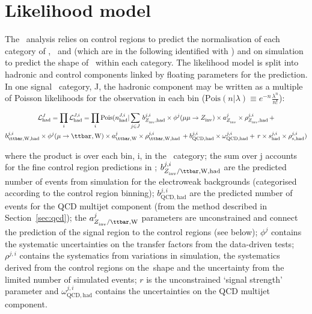 \section{Likelihood model}
\label{sec:likelihood}

The \alphat~analysis relies on control regions to predict the normalisation of each category of \njet, \nb~and \scalht 
(which are in the following identified with \htcat) and on simulation to predict the shape 
of \mht~within each category. The likelihood model is split into hadronic and control components
linked by floating parameters for the prediction. In one signal \htcat~category, J, 
the hadronic component may be written as a multiple of Poisson likelihoods
for the observation in each \mht bin 
($\mathrm{Pois}(n|\lambda) \equiv e^{-n}\frac{\lambda^{n}}{n!}$):

\begin{multline}
\label{eq:hadronicLikelihood}
\mathcal{L}^{J}_{\mathrm{had}} = \prod_i \mathcal{L}^{J,i}_{\mathrm{had}} = \prod_i \mathrm{Pois}(n^{J,i}_{\mathrm{had}} |\sum_{j \in J}\, b^{j,i}_{\zInv~,\mathrm{had}}\times\phi^{j}(\mu\mu\rightarrow\zInv~)\times a_{\zInv~}^{j}\times\rho^{j,i}_{\zInv~,\mathrm{had}}\, + \\ 
b^{j,i}_{\ttw,\mathrm{had}}\times\phi^{j}(\mu\rightarrow\ttw)\times a_{\ttw}^{j}\times\rho^{j,i}_{\ttw,\mathrm{had}}\, + b^{j,i}_{\text{QCD},\mathrm{had}}\times\omega^{j,i}_{\text{QCD},\mathrm{had}} + \,r\times s^{j,i}_{\mathrm{had}}\times\rho^{j,i}_{s,\mathrm{had}}) 
\end{multline}

where 
the product is over each \mht bin, i, in the \htcat~category;
the sum over j accounts for the fine control region predictions in \scalht; 
$b^{j,i}_{\zInv~/\ttw,\mathrm{had}}$ are the predicted number 
of events from simulation for the electroweak backgrounds (categorised according to the control region binning); 
$b^{j,i}_{\text{QCD},\mathrm{had}}$ are the predicted 
number of events for the QCD multijet component (from the method described in Section~\ref{sec:qcd});
the $a_{\zInv~/\ttw}^{j}$ parameters are unconstrained and connect the prediction of the signal region
to the control regions (see below); $\phi^{j}$ contains the systematic uncertainties on the 
transfer factors from the data-driven tests; $\rho^{j,i}$ contains the systematics from 
variations in simulation, the systematics derived from the control regions on the~\mht shape 
and the uncertainty from the limited number of simulated events; 
$r$ is the unconstrained `signal strength' parameter and $\omega_{\text{QCD},\mathrm{had}}^{j,i}$ 
contains the uncertainties on the QCD multijet component. 

